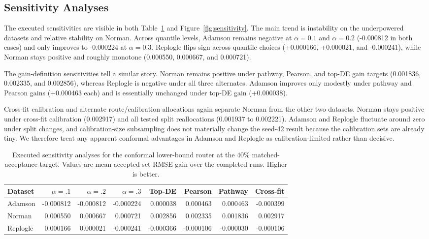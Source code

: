 \documentclass{article}
\begin{document}
\subsection{Sensitivity Analyses}
The executed sensitivities are visible in both Table~\ref{tab:sensitivity} and Figure~\ref{fig:sensitivity}. The main trend is instability on the underpowered datasets and relative stability on Norman. Across quantile levels, Adamson remains negative at $\alpha=0.1$ and $\alpha=0.2$ (-0.000812 in both cases) and only improves to -0.000224 at $\alpha=0.3$. Replogle flips sign across quantile choices (+0.000166, +0.000021, and -0.000241), while Norman stays positive and roughly monotone (0.000550, 0.000667, and 0.000721).

The gain-definition sensitivities tell a similar story. Norman remains positive under pathway, Pearson, and top-DE gain targets (0.001836, 0.002335, and 0.002856), whereas Replogle is negative under all three alternates. Adamson improves only modestly under pathway and Pearson gains (+0.000463 each) and is essentially unchanged under top-DE gain (+0.000038).

Cross-fit calibration and alternate route/calibration allocations again separate Norman from the other two datasets. Norman stays positive under cross-fit calibration (0.002917) and all tested split reallocations (0.001937 to 0.002221). Adamson and Replogle fluctuate around zero under split changes, and calibration-size subsampling does not materially change the seed-42 result because the calibration sets are already tiny. We therefore treat any apparent conformal advantages in Adamson and Replogle as calibration-limited rather than decisive.

\begin{table}[t]
\caption{Executed sensitivity analyses for the conformal lower-bound router at the 40\% matched-acceptance target. Values are mean accepted-set RMSE gain over the completed runs. Higher is better.}
\label{tab:sensitivity}
\centering
\scriptsize
\begin{tabular}{lrrrrrrr}
\toprule
Dataset & $\alpha=.1$ & $\alpha=.2$ & $\alpha=.3$ & Top-DE & Pearson & Pathway & Cross-fit \\
\midrule
Adamson & -0.000812 & -0.000812 & -0.000224 & 0.000038 & 0.000463 & 0.000463 & -0.000399 \\
Norman & 0.000550 & 0.000667 & 0.000721 & 0.002856 & 0.002335 & 0.001836 & 0.002917 \\
Replogle & 0.000166 & 0.000021 & -0.000241 & -0.000366 & -0.000106 & -0.000030 & -0.000106 \\
\bottomrule
\end{tabular}
\end{table}
\end{document}
